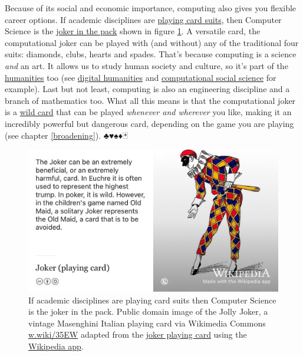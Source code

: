 \documentclass[
]{book}
\begin{document}
Because of its social and economic importance, computing also gives you flexible career options. If academic disciplines are \href{https://en.wikipedia.org/wiki/Playing_card_suit}{playing card suits}, then Computer Science is the \href{https://en.wikipedia.org/wiki/Joker_(playing_card)}{joker in the pack} shown in figure \ref{fig:joker-fig}. A versatile card, the computational joker can be played with (and without) any of the traditional four suits: diamonds, clubs, hearts and spades. That's because computing is a science \emph{and} an art. It allows us to study human society and culture, so it's part of the \href{https://en.wikipedia.org/wiki/Humanities}{humanities} too (see \href{https://en.wikipedia.org/wiki/Digital_humanities}{digital humanities} and \href{https://en.wikipedia.org/wiki/Computational_social_science}{computational social science} for example). Last but not least, computing is also an engineering discipline and a branch of mathematics too. What all this means is that the computational joker is a \href{https://en.wikipedia.org/wiki/Wild_card_(cards)}{wild card} that can be played \emph{whenever and wherever} you like, making it an incredibly powerful but dangerous card, depending on the game you are playing (see chapter \ref{broadening}). ♣♥♠♦🃏

\begin{figure}

{\centering \includegraphics[width=1\linewidth]{images/wikijoker} 

}

\caption{If academic disciplines are playing card suits then Computer Science is the joker in the pack. Public domain image of the Jolly Joker, a vintage Masenghini Italian playing card via Wikimedia Commons \href{https://w.wiki/35EW}{w.wiki/35EW} adapted from the \href{https://en.wikipedia.org/wiki/Joker_(playing_card)}{joker playing card} using the \href{https://apps.apple.com/gb/app/wikipedia/id324715238}{Wikipedia app}.}\label{fig:joker-fig}
\end{figure}
\end{document}
